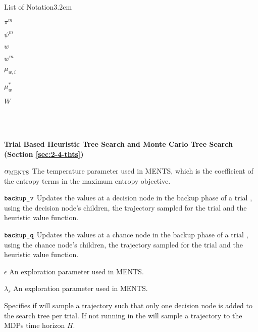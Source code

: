 \begin{mclistof}{List of Notation}{3.2cm}
    \item[$\pi^m$] 
    \item[$\psi^m$] 
    \item[$w$] 
    \item[$w^m$] 
    \item[$\mu_{w,i}$] 
    \item[$\mu_{w}^*$] 
    \item[$W$] 
    \item[$ $] 
    \item[$ $] 
    \item[$ $] 
    \item[$ $] 
    \\
    \item[{\parbox[t]{\textwidth}{\Large\textbf{Trial Based Heuristic Tree Search and Monte Carlo Tree Search (Section \ref{sec:2-4-thts})}\hfill\hfill}}]
    \item[$\alpha_{{\textnormal{MENTS}}}$] 
        The temperature parameter used in MENTS, which is the coefficient of the entropy terms in the maximum entropy objective.
    \item[${\textnormal{\texttt{backup\_v}}}$]
        Updates the values at a decision node in the backup phase of a trial \thtspp, using the decision node's children, the trajectory sampled for the trial and the heuristic value function.
    \item[${\textnormal{\texttt{backup\_q}}}$] 
        Updates the values at a chance node in the backup phase of a trial \thtspp, using the chance node's children, the trajectory sampled for the trial and the heuristic value function.
    \item[$\epsilon$]
        An exploration parameter used in MENTS.
    \item[$\lambda_s$] 
        An exploration parameter used in MENTS.
    \item[\mctsmode] 
        Specifies if \thtspp\ewe will sample a trajectory such that only one decision node is added to the search tree per trial. If not running in \mctsmode\ewe the \thtspp\ewe will sample a trajectory to the MDPs time horizon $H$.

\end{mclistof}
